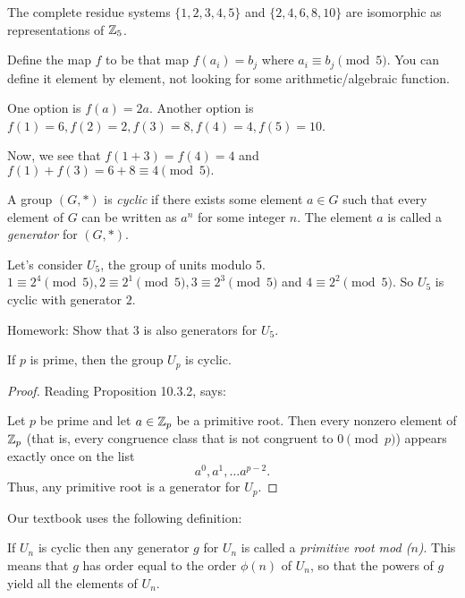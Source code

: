 \documentclass[letterpaper, 11 pt]{article}
\begin{document}
\begin{br}[2 min]
 The complete residue systems $\{1,2,3,4,5\}$ and $\{2,4,6,8,10\}$ are isomorphic as representations of $\mathbb Z_5$.
 
 Define the map $f$ to be that map $f(a_i)=b_j$ where $a_i\equiv b_j \pmod 5$. You can define it element by element, not looking for some arithmetic/algebraic function.
\end{br}
\begin{solution} One option is $f(a)=2a$. Another option is
 $f(1)=6, f(2)=2, f(3)=8, f(4)=4, f(5)=10$.
\end{solution}

Now, we see that $f(1+3)=f(4)=4$ and $f(1)+f(3)=6+8\equiv 4 \pmod 5.$

\begin{defn}
 A group $(G, *)$ is \emph{cyclic} if there exists some element $a\in G$ such that every element of $G$ can be written as $a^n$ for some integer $n$. The element $a$ is called a \emph{generator} for $(G,*)$.
 \end{defn}
\begin{example}
 Let's consider $U_5$, the group of units modulo 5. $1\equiv 2^4 \pmod 5, 2\equiv 2^1 \pmod 5, 3\equiv 2^3 \pmod 5$ and $4\equiv 2^2 \pmod 5.$ So $U_5$ is cyclic with generator $2$. 
 
 Homework: Show that $3$ is also generators for $U_5$.
\end{example}

\begin{cor}[Corollary 6.6]
 If $p$ is prime, then the group $U_p$ is cyclic.
\end{cor}
\begin{proof}
 Reading Proposition 10.3.2, says:
 
 Let $p$ be prime and let $a\in\mathbb Z_p$ be a primitive root. Then every nonzero element of $\mathbb Z_p$ (that is, every congruence class that is not congruent to $0\pmod p$) appears exactly once on the list \[a^0, a^1, \dots a^{p-2}.\]
 Thus, any primitive root is a generator for $U_p$.
\end{proof}

Our textbook uses the following definition: 
\begin{defn}
 If $U_n$ is cyclic then any generator $g$ for $U_n$ is called a\emph{ primitive root mod ($n$)}. This means that $g$ has order equal to the order $\phi(n)$ of $U_n$, so that the powers of $g$ yield all the elements of $U_n$. 
\end{defn}
\end{document}

